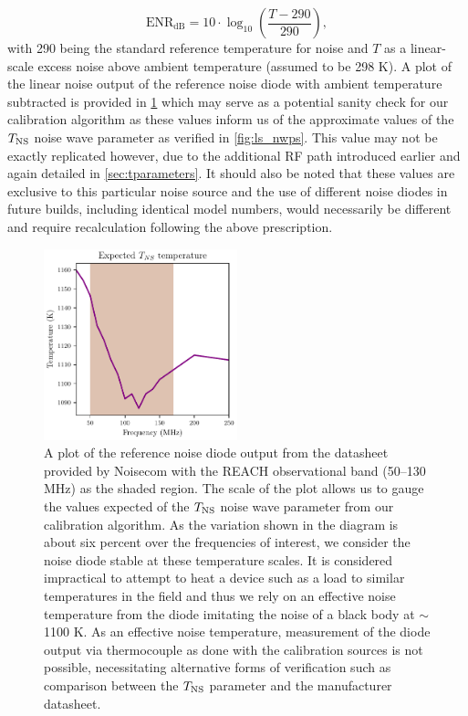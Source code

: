 \begin{equation}
    \mathrm{ENR_{dB}} = 10 \cdot \log_{10} \left( \frac{T - 290}{290}\right),
\end{equation}
with 290 being the standard reference temperature for noise and $T$ as a linear-scale excess noise above ambient temperature (assumed to be 298 K). A plot of the linear noise output of the reference noise diode with ambient temperature subtracted is provided in \cref{fig:ns_diode} which may serve as a potential sanity check for our calibration algorithm as these values inform us of the approximate values of the $T_{\mathrm{NS}}$ noise wave parameter as verified in \cref{fig:ls_nwps}. This value may not be exactly replicated however, due to the additional RF path introduced earlier and again detailed in \cref{sec:tparameters}. It should also be noted that these values are exclusive to this particular noise source and the use of different noise diodes in future builds, including identical model numbers, would necessarily be different and require recalculation following the above prescription.
\begin{figure}
    \centering
    \includegraphics[width=0.5\textwidth]{ns_diode}
    \caption{A plot of the reference noise diode output from the datasheet provided by Noisecom with the REACH observational band (50--130 MHz) as the shaded region. The scale of the plot allows us to gauge the values expected of the $T_{\mathrm{NS}}$ noise wave parameter from our calibration algorithm. As the variation shown in the diagram is about six percent over the frequencies of interest, we consider the noise diode stable at these temperature scales. It is considered impractical to attempt to heat a device such as a load to similar temperatures in the field and thus we rely on an effective noise temperature from the diode imitating the noise of a black body at $\sim$1100 K. As an effective noise temperature, measurement of the diode output via thermocouple as done with the calibration sources is not possible, necessitating alternative forms of verification such as comparison between the $T_{\mathrm{NS}}$ parameter and the manufacturer datasheet.}
    \label{fig:ns_diode}
\end{figure}


